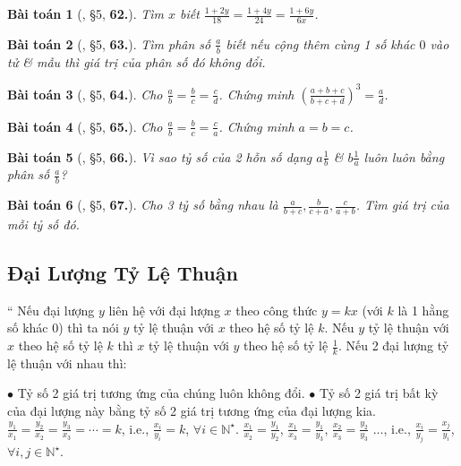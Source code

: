 \documentclass{article}
\newtheorem{baitoan}{Bài toán}
\begin{document}
\begin{baitoan}[\cite{Binh_Toan_7_tap_1}, \S5, \textbf{62.}]
	Tìm $x$ biết $\frac{1 + 2y}{18} = \frac{1 + 4y}{24} = \frac{1 + 6y}{6x}$.
\end{baitoan}

\begin{baitoan}[\cite{Binh_Toan_7_tap_1}, \S5, \textbf{63.}]
	Tìm phân số $\frac{a}{b}$ biết nếu cộng thêm cùng 1 số khác $0$ vào tử \& mẫu thì giá trị của phân số đó không đổi.
\end{baitoan}

\begin{baitoan}[\cite{Binh_Toan_7_tap_1}, \S5, \textbf{64.}]
	Cho $\frac{a}{b} = \frac{b}{c} = \frac{c}{d}$. Chứng minh $\left(\frac{a + b + c}{b + c + d}\right)^3 = \frac{a}{d}$.
\end{baitoan}

\begin{baitoan}[\cite{Binh_Toan_7_tap_1}, \S5, \textbf{65.}]
	Cho $\frac{a}{b} = \frac{b}{c} = \frac{c}{a}$. Chứng minh $a = b = c$.
\end{baitoan}

\begin{baitoan}[\cite{Binh_Toan_7_tap_1}, \S5, \textbf{66.}]
	Vì sao tỷ số của 2 hỗn số dạng $a\frac{1}{b}$ \& $b\frac{1}{a}$ luôn luôn bằng phân số $\frac{a}{b}$?
\end{baitoan}

\begin{baitoan}[\cite{Binh_Toan_7_tap_1}, \S5, \textbf{67.}]
	Cho 3 tỷ số bằng nhau là $\frac{a}{b + c},\frac{b}{c + a},\frac{c}{a + b}$. Tìm giá trị của mỗi tỷ số đó.
\end{baitoan}


\subsection{Đại Lượng Tỷ Lệ Thuận}
``
	 Nếu đại lượng $y$ liên hệ với đại lượng $x$ theo công thức $y = kx$ (với $k$ là 1 hằng số khác $0$) thì ta nói $y$ tỷ lệ thuận với $x$ theo hệ số tỷ lệ $k$. Nếu $y$ tỷ lệ thuận với $x$ theo hệ số tỷ lệ $k$ thì $x$ tỷ lệ thuận với $y$ theo hệ số tỷ lệ $\frac{1}{k}$.
	 Nếu 2 đại lượng tỷ lệ thuận với nhau thì:
	
		$\bullet$ Tỷ số 2 giá trị tương ứng của chúng luôn không đổi.
		$\bullet$ Tỷ số 2 giá trị bất kỳ của đại lượng này bằng tỷ số 2 giá trị tương ứng của đại lượng kia. $\frac{y_1}{x_1} = \frac{y_2}{x_2} = \frac{y_3}{x_3} = \cdots = k$, i.e., $\frac{x_i}{y_i} = k$, $\forall i\in\mathbb{N}^\star$. $\frac{x_1}{x_2} = \frac{y_1}{y_2}$, $\frac{x_1}{x_3} = \frac{y_1}{y_3}$, $\frac{x_2}{x_3} = \frac{y_2}{y_3}$ $\ldots$, i.e., $\frac{x_i}{y_j} = \frac{x_j}{y_i}$, $\forall i,j\in\mathbb{N}^\star$.
		
\end{document}
